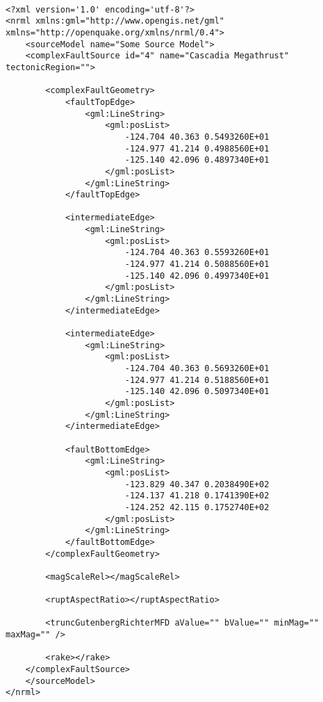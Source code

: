 \begin{Verbatim}[frame=single, commandchars=\\\{\}, fontsize=\scriptsize]

<?xml version='1.0' encoding='utf-8'?>
<nrml xmlns:gml="http://www.opengis.net/gml" xmlns="http://openquake.org/xmlns/nrml/0.4">
    <sourceModel name="Some Source Model">
    <complexFaultSource id="4" name="Cascadia Megathrust" tectonicRegion="">

        <complexFaultGeometry>
            <faultTopEdge>
                <gml:LineString>
                    <gml:posList>
                        -124.704 40.363 0.5493260E+01
                        -124.977 41.214 0.4988560E+01
                        -125.140 42.096 0.4897340E+01
                    </gml:posList>
                </gml:LineString>
            </faultTopEdge>

            <intermediateEdge>
                <gml:LineString>
                    <gml:posList>
                        -124.704 40.363 0.5593260E+01
                        -124.977 41.214 0.5088560E+01
                        -125.140 42.096 0.4997340E+01
                    </gml:posList>
                </gml:LineString>
            </intermediateEdge>

            <intermediateEdge>
                <gml:LineString>
                    <gml:posList>
                        -124.704 40.363 0.5693260E+01
                        -124.977 41.214 0.5188560E+01
                        -125.140 42.096 0.5097340E+01
                    </gml:posList>
                </gml:LineString>
            </intermediateEdge>

            <faultBottomEdge>
                <gml:LineString>
                    <gml:posList>
                        -123.829 40.347 0.2038490E+02
                        -124.137 41.218 0.1741390E+02
                        -124.252 42.115 0.1752740E+02
                    </gml:posList>
                </gml:LineString>
            </faultBottomEdge>
        </complexFaultGeometry>

        <magScaleRel></magScaleRel>
        
        <ruptAspectRatio></ruptAspectRatio>

        <truncGutenbergRichterMFD aValue="" bValue="" minMag="" maxMag="" />

        <rake></rake>
    </complexFaultSource>
    </sourceModel>
</nrml>

\end{Verbatim}

